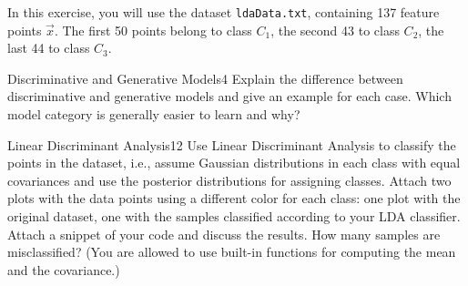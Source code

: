 \newif\ifvimbug
\vimbugfalse

\ifvimbug

\fi


In this exercise, you will use the dataset \texttt{ldaData.txt}, containing 137 feature points $\vec x$. The first 50 points belong to class $C_1$, the second 43 to class $C_2$, the last 44 to class $C_3$.


\begin{questions}

\begin{question}{Discriminative and Generative Models}{4}
Explain the difference between discriminative and generative models and give an example for each case.
Which model category is generally easier to learn and why?
 
\begin{answer}\end{answer}

\end{question}


\begin{question}{Linear Discriminant Analysis}{12}
Use Linear Discriminant Analysis to classify the points in the dataset, i.e., assume Gaussian distributions in each class with equal covariances and use the posterior distributions for assigning classes. Attach two plots with the data points using a different color for each class: one plot with the original dataset, one with the samples classified according to your LDA classifier. Attach a snippet of your code and discuss the results. How many samples are misclassified? (You are allowed to use built-in functions for computing the mean and the covariance.)

\begin{answer}\end{answer}
\end{question}


\end{questions}

